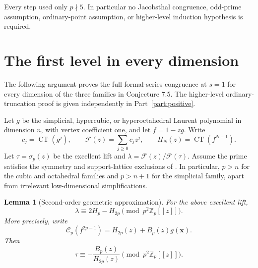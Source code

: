 \documentclass[11pt,a4paper]{article}
\newtheorem{lemma}[theorem]{Lemma}
\theoremstyle{definition}\newtheorem{definition}[theorem]{Definition}
\theoremstyle{remark}\newtheorem{remark}[theorem]{Remark}
\numberwithin{equation}{section}
\begin{document}
Every step used only \(p\nmid5\).
In particular no Jacobsthal congruence, odd-prime assumption,
ordinary-point assumption, or higher-level induction
hypothesis is required.

\section{The first level in every dimension}\label{T:source-main-3}
\label{T:sec:all-dim-first}

The following argument proves the full formal-series congruence at
\(s=1\) for every dimension of the three families in Conjecture 7.5.
The higher-level ordinary-truncation proof is given independently in Part~\ref{part:positive}.

Let \(g\) be the simplicial, hypercubic, or hyperoctahedral Laurent
polynomial in dimension \(n\), with vertex coefficient one, and let
\(f=1-zg\).  Write
\[
 c_j=\operatorname{CT}(g^j),\qquad
 \mathcal F(z)=\sum_{j\geq0}c_jz^j,\qquad
 H_N(z)=\operatorname{CT}(f^{N-1}).
\]
Let \(\tau=\sigma_p(z)\) be the excellent lift and
\(\lambda=\mathcal F(z)/\mathcal F(\tau)\).
Assume the prime satisfies the symmetry and support-lattice exclusions
of \cite[Theorem 7.3]{BV3}.  In particular, \(p>n\) for the cubic and
octahedral families and \(p>n+1\) for the simplicial family, apart from
irrelevant low-dimensional simplifications.

\begin{lemma}[Second-order geometric approximation]
\label{T:lem:second-geometric}
For the above excellent lift,
\[
 \lambda\equiv2H_p-H_{2p}\pmod{p^2\mathbb Z_p[[z]]}.
\]
More precisely, write
\[
 \mathscr C_p(f^{2p-1})=H_{2p}(z)+B_p(z)g(\mathbf{x}).
\]
Then
\[
 \tau\equiv-\frac{B_p(z)}{H_{2p}(z)}\pmod{p^2\mathbb Z_p[[z]]}.
\]
\end{lemma}
\end{document}
